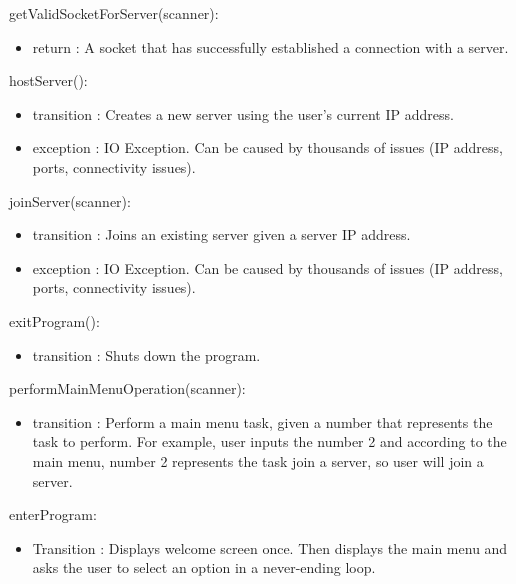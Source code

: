 \documentclass[12pt, titlepage]{article}
\begin{document}
        \noindent getValidSocketForServer(scanner):
        \begin{itemize}
        \item return : A socket that has successfully established a connection with a server.
        \end{itemize}
        
        \noindent hostServer():
        \begin{itemize}
        \item transition : Creates a new server using the user's current IP address.
        \item exception : IO Exception. Can be caused by thousands of issues (IP address, ports, connectivity issues).
        \end{itemize}
        
        \noindent joinServer(scanner):
        \begin{itemize}
        \item transition : Joins an existing server given a server IP address.
        \item exception : IO Exception. Can be caused by thousands of issues (IP address, ports, connectivity issues).
        \end{itemize}

        \noindent exitProgram():
        \begin{itemize}
        \item transition : Shuts down the program.
        \end{itemize}
        
        \noindent performMainMenuOperation(scanner):
        \begin{itemize}
        \item transition : Perform a main menu task, given a number that represents the task to perform. For example, user inputs the number 2 and according to the main menu, number 2 represents the task join a server, so user will join a server.
        \end{itemize}
        
        \noindent enterProgram:
        \begin{itemize}
        \item Transition : Displays welcome screen once. Then displays the main menu and asks the user to select an option in a never-ending loop.
        \end{itemize}
        
        
\end{document}
